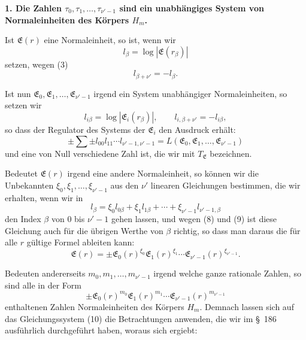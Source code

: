 \documentclass[11pt]{article}
\begin{document}
\begin{center}\textbf{1. Die Zahlen $\tau_0,\tau_1,\ldots,\tau_{\nu'-1}$ sind ein unabhängiges System von Normaleinheiten des Körpers $H_m$.}\end{center}

Ist $\mathfrak E(r)$ eine Normaleinheit, so ist, wenn wir
\begin{equation}
l_\beta=\log|\mathfrak E(r_\beta)|
\tag{7}
\end{equation}
setzen, wegen (3)
\begin{equation}
l_{\beta+\nu'}=-l_\beta.
\tag{8}
\end{equation}

Ist nun $\mathfrak E_0,\mathfrak E_1,\ldots,\mathfrak E_{\nu'-1}$ irgend ein System unabhängiger Normaleinheiten, so setzen wir
\begin{equation}
l_{i\beta}=\log|\mathfrak E_i(r_\beta)|,\qquad l_{i,\beta+\nu'}=-l_{i\beta},
\tag{9}
\end{equation}
so dass der Regulator des Systems der $\mathfrak E_i$ den Ausdruck erhält:
\begin{equation}
\pm\sum\pm l_{00}l_{11}\cdots l_{\nu'-1,\nu'-1}=L(\mathfrak E_0,\mathfrak E_1,\ldots,\mathfrak E_{\nu'-1})
\tag{10}
\end{equation}
und eine von Null verschiedene Zahl ist, die wir mit $T_\mathfrak E$ bezeichnen.

Bedeutet $\mathfrak E(r)$ irgend eine andere Normaleinheit, so können wir die Unbekannten $\xi_0,\xi_1,\ldots,\xi_{\nu'-1}$ aus den $\nu'$ linearen Gleichungen bestimmen, die wir erhalten, wenn wir in
\begin{equation}
l_\beta=\xi_0l_{0\beta}+\xi_1l_{1\beta}+\cdots+\xi_{\nu'-1}l_{\nu'-1,\beta}
\tag{11}
\end{equation}
den Index $\beta$ von $0$ bis $\nu'-1$ gehen lassen, und wegen (8) und (9) ist diese Gleichung auch für die übrigen Werthe von $\beta$ richtig, so dass man daraus die für alle $r$ gültige Formel ableiten kann:
\begin{equation}
\mathfrak E(r)=\pm\mathfrak E_0(r)^{\xi_0}\mathfrak E_1(r)^{\xi_1}\cdots\mathfrak E_{\nu'-1}(r)^{\xi_{\nu'-1}}.
\tag{12}
\end{equation}

Bedeuten andererseits $m_0,m_1,\ldots,m_{\nu'-1}$ irgend welche ganze rationale Zahlen, so sind alle in der Form
\[
\pm\mathfrak E_0(r)^{m_0}\mathfrak E_1(r)^{m_1}\cdots\mathfrak E_{\nu'-1}(r)^{m_{\nu'-1}}
\]
enthaltenen Zahlen Normaleinheiten des Körpers $H_m$. Demnach lassen sich auf das Gleichungssystem (10) die Betrachtungen anwenden, die wir im \S~186 ausführlich durchgeführt haben, woraus sich ergiebt:
\end{document}
